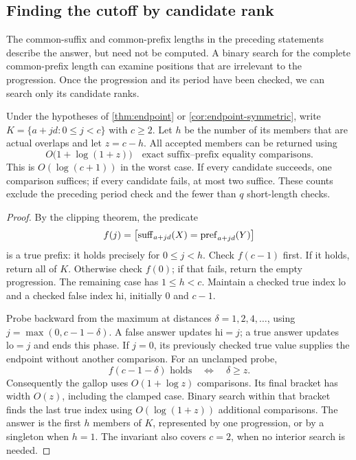 \subsection{Finding the cutoff by candidate rank}

The common-suffix and common-prefix lengths in the preceding statements
describe the answer, but need not be computed. A binary search for the
complete common-prefix length can examine positions that are irrelevant
to the progression. Once the progression and its period have been checked,
we can search only its candidate ranks.

\begin{corollary}
\label{cor:endpoint-rank}
Under the hypotheses of \cref{thm:endpoint} or
\cref{cor:endpoint-symmetric}, write
$K=\{a+jd:0\leq j<c\}$ with $c\geq2$. Let $h$ be the number of its
members that are actual overlaps and let $z=c-h$.
All accepted members can be returned using
\begin{equation}
 O\bigl(1+\log(1+z)\bigr)
 \quad\text{exact suffix--prefix equality comparisons}.
 \label{eq:rank-comparisons}
\end{equation}
This is $O(\log(c+1))$ in the worst case. If every candidate succeeds,
one comparison suffices; if every candidate fails, at most two suffice.
These counts exclude the preceding period check and the fewer than $q$
short-length checks.
\end{corollary}
\begin{proof}
By the clipping theorem, the predicate
\[
 f(j)=\bigl[\operatorname{suff}_{a+jd}(X)=\operatorname{pref}_{a+jd}(Y)\bigr]
\]
is a true prefix: it holds precisely for $0\leq j<h$.
Check $f(c-1)$ first. If it holds, return all of $K$.
Otherwise check $f(0)$; if that fails, return the empty progression.
The remaining case has $1\leq h<c$. Maintain a checked true index
$\mathrm{lo}$ and a checked false index $\mathrm{hi}$, initially
$0$ and $c-1$.

Probe backward from the maximum at distances
$\delta=1,2,4,\ldots$, using $j=\max(0,c-1-\delta)$.
A false answer updates $\mathrm{hi}=j$; a true answer updates
$\mathrm{lo}=j$ and ends this phase. If $j=0$, its previously checked
true value supplies the endpoint without another comparison.
For an unclamped probe,
\[
 f(c-1-\delta)\text{ holds}
 \quad\Longleftrightarrow\quad \delta\geq z.
\]
Consequently the gallop uses $O(1+\log z)$ comparisons. Its final
bracket has width $O(z)$, including the clamped case. Binary search within
that bracket finds the last true index using $O(\log(1+z))$ additional
comparisons. The answer is the first $h$ members of $K$, represented by
one progression, or by a singleton when $h=1$.
The invariant also covers $c=2$, when no interior search is needed.
\end{proof}

